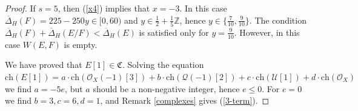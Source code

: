 \documentclass[10pt,a4paper]{amsart}
\begin{document}
\begin{proof}
		If $s=5$, then (\ref{x4}) implies that $x=-3$. In this case $\overline{\Delta}_H(F)=225-250y\in[0,60)$ and $y\in\frac 12+\frac 15\mathbb Z$, hence $y\in\{\frac{7}{10},\frac{9}{10}\}$. The condition $\overline{\Delta}_H(F)+\overline{\Delta}_H(E/F)<\overline{\Delta}_H(E)$ is satisfied only for $y=\frac{9}{10}$. However, in this case $W(E,F)$ is empty.
		
		We have proved that $E[1]\in\mathfrak C$. Solving the equation $\mathrm{ch}(E[1])=a\cdot\mathrm{ch}(\mathcal O_X(-1)[3])+b\cdot\mathrm{ch}(\mathcal Q(-1)[2])+c\cdot\mathrm{ch}(\mathcal U[1])+d\cdot\mathrm{ch}(\mathcal O_X)$ we find $a=-5e$, but $a$ should be a non-negative integer, hence $e\le 0$. For $e=0$ we find $b=3,c=6,d=1$, and Remark \ref{complexes} gives (\ref{3-term}).
	\end{proof}
\end{document}
